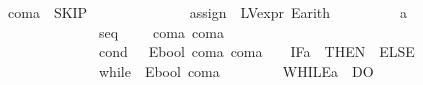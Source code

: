 \begin{isabellebody}
\isanewline
\isanewline
{}\isamarkupfalse%
\ com\isactrlsub a\ {\isacharequal}{\kern0pt}\ SKIP\isanewline
\ \ \ \ \ \ \ \ \ \ \ \ \ {\isacharbar}{\kern0pt}\ assign\ \ LV\isactrlsub e\isactrlsub x\isactrlsub p\isactrlsub r\ E\isactrlsub a\isactrlsub r\isactrlsub i\isactrlsub t\isactrlsub h\ \ \ \ \ \ \ \ {\isacharparenleft}{\kern0pt}{\isachardoublequoteopen}\ {\isacharunderscore}{\kern0pt}\ {\isacharcolon}{\kern0pt}{\isacharequal}{\kern0pt}\isactrlsub a\ {\isacharunderscore}{\kern0pt}{\isachardoublequoteclose}\ {\isacharbrackleft}{\kern0pt}{}{}{\isacharcomma}{\kern0pt}{}{}{\isacharbrackright}{\kern0pt}{}{}{\isacharparenright}{\kern0pt}\isanewline
\ \ \ \ \ \ \ \ \ \ \ \ \ {\isacharbar}{\kern0pt}\ seq\ \ \ \ \ com\isactrlsub a\ com\isactrlsub a\ \ \ \ \ \ \ \ \ \ {\isacharparenleft}{\kern0pt}\ {\isachardoublequoteopen}{\isacharsemicolon}{\kern0pt}{\isacharsemicolon}{\kern0pt}{\isachardoublequoteclose}\ {}{}{\isacharparenright}{\kern0pt}\isanewline
\ \ \ \ \ \ \ \ \ \ \ \ \ {\isacharbar}{\kern0pt}\ cond\ \ \ {\isachardoublequoteopen}E\isactrlsub b\isactrlsub o\isactrlsub o\isactrlsub l{\isachardoublequoteclose}\ com\isactrlsub a\ com\isactrlsub a\ \ \ \ {\isacharparenleft}{\kern0pt}{\isachardoublequoteopen}IF\isactrlsub a\ {\isacharparenleft}{\kern0pt}{\isacharunderscore}{\kern0pt}{\isacharparenright}{\kern0pt}{\isacharslash}{\kern0pt}\ THEN\ {\isacharparenleft}{\kern0pt}{\isacharunderscore}{\kern0pt}{\isacharparenright}{\kern0pt}{\isacharslash}{\kern0pt}\ ELSE\ {\isacharparenleft}{\kern0pt}{\isacharunderscore}{\kern0pt}{\isacharparenright}{\kern0pt}{\isacharslash}{\kern0pt}{\isachardoublequoteclose}\ {\isacharbrackleft}{\kern0pt}{}{\isacharcomma}{\kern0pt}{}{\isacharcomma}{\kern0pt}{}{}{\isacharbrackright}{\kern0pt}{}{}{\isacharparenright}{\kern0pt}\isanewline
\ \ \ \ \ \ \ \ \ \ \ \ \ {\isacharbar}{\kern0pt}\ while\ \ {\isachardoublequoteopen}E\isactrlsub b\isactrlsub o\isactrlsub o\isactrlsub l{\isachardoublequoteclose}\ com\isactrlsub a\ \ \ \ \ \ \ \ \ {\isacharparenleft}{\kern0pt}{\isachardoublequoteopen}WHILE\isactrlsub a\ {\isacharparenleft}{\kern0pt}{\isacharunderscore}{\kern0pt}{\isacharparenright}{\kern0pt}{\isacharslash}{\kern0pt}\ DO\ {\isacharparenleft}{\kern0pt}{\isacharunderscore}{\kern0pt}{\isacharparenright}{\kern0pt}{\isachardoublequoteclose}\ {\isacharbrackleft}{\kern0pt}{}{\isacharcomma}{\kern0pt}{}{}{\isacharbrackright}{\kern0pt}{}{}{\isacharparenright}{\kern0pt}\isanewline

\end{isabellebody}
